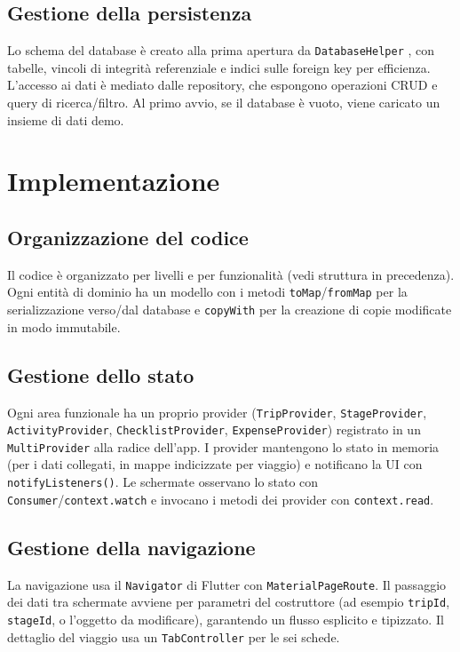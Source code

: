 \documentclass[11pt, a4paper]{article}
\begin{document}
\subsection{Gestione della persistenza}
Lo schema del database è creato alla prima apertura da \texttt{DatabaseHelper} 
, con tabelle, vincoli di integrità referenziale e indici sulle foreign key per
efficienza. L'accesso ai dati è mediato dalle repository, che espongono operazioni CRUD e
query di ricerca/filtro. Al primo avvio, se il database è vuoto, viene caricato un
insieme di dati demo.

\section{Implementazione}

\subsection{Organizzazione del codice}
Il codice è organizzato per livelli e per funzionalità (vedi struttura in precedenza).
Ogni entità di dominio ha un modello con i metodi \texttt{toMap}/\texttt{fromMap} per la
serializzazione verso/dal database e \texttt{copyWith} per la creazione di copie
modificate in modo immutabile.

\subsection{Gestione dello stato}
Ogni area funzionale ha un proprio provider (\texttt{TripProvider},
\texttt{StageProvider}, \texttt{ActivityProvider}, \texttt{ChecklistProvider},
\texttt{ExpenseProvider}) registrato in un \texttt{MultiProvider} alla radice dell'app. I
provider mantengono lo stato in memoria (per i dati collegati, in mappe indicizzate per
viaggio) e notificano la UI con \texttt{notifyListeners()}. Le schermate osservano lo
stato con \texttt{Consumer}/\texttt{context.watch} e invocano i metodi dei provider con
\texttt{context.read}.

\subsection{Gestione della navigazione}
La navigazione usa il \texttt{Navigator} di Flutter con \texttt{MaterialPageRoute}. Il
passaggio dei dati tra schermate avviene per parametri del costruttore (ad esempio
\texttt{tripId}, \texttt{stageId}, o l'oggetto da modificare), garantendo un flusso
esplicito e tipizzato. Il dettaglio del viaggio usa un \texttt{TabController} per le sei
schede.
\end{document}
